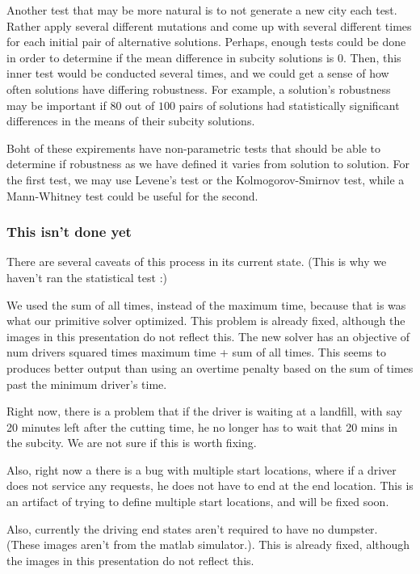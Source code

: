 \documentclass{article}
\begin{document}
Another test that may be more natural is to not generate a new city each test.
Rather apply several different mutations and come up with several different times for each initial pair of alternative solutions.
Perhaps, enough tests could be done in order to determine if the mean difference in subcity solutions is $0$.
Then, this inner test would be conducted several times, and we could get a sense of how often solutions have differing robustness.
For example, a solution's robustness may be important if $80$ out of $100$ pairs of solutions had statistically significant differences in the means of their subcity solutions.

Boht of these expirements have non-parametric tests that should be able to determine if robustness as we have defined it varies from solution to solution.
For the first test, we may use Levene's test or the Kolmogorov-Smirnov test, while a Mann-Whitney test could be useful for the second.

\subsubsection{This isn't done yet}
There are several caveats of this process in its current state.
(This is why we haven't ran the statistical test :)

We used the sum of all times, instead of the maximum time, because that is was what our primitive solver optimized.
This problem is already fixed, although the images in this presentation do not reflect this.
The new solver has an objective of num drivers squared times maximum time + sum of all times.
This seems to produces better output than using an overtime penalty based on the sum of times past the minimum driver's time.

Right now, there is a problem that if the driver is waiting at a landfill, with say 20 minutes left after the cutting time, he no longer has to wait that 20 mins in the subcity.
We are not sure if this is worth fixing.

Also, right now a there is a bug with multiple start locations, where if a driver does not service any requests, he does not have to end at the end location.
This is an artifact of trying to define multiple start locations, and will be fixed soon.

Also, currently the driving end states aren't required to have no dumpster.
(These images aren't from the matlab simulator.).
This is already fixed, although the images in this presentation do not reflect this.
\end{document}
